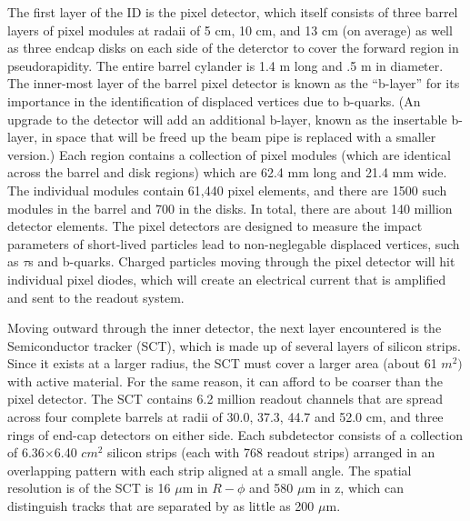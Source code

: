 The first layer of the ID is the pixel detector, which itself consists of three barrel layers of pixel modules at radaii of 5 cm, 10 cm, and 13 cm (on average) as well as three endcap disks on each side of the deterctor to cover the forward region in pseudorapidity.
The entire barrel cylander is 1.4 m long and .5 m in diameter.
The inner-most layer of the barrel pixel detector is known as the ``b-layer'' for its importance in the identification of displaced vertices due to b-quarks.
(An upgrade to the detector will add an additional b-layer, known as the insertable b-layer, in space that will be freed up the beam pipe is replaced with a smaller version.)
Each region contains a collection of pixel modules (which are identical across the barrel and disk regions) which are 62.4 mm long and 21.4 mm wide.
The individual modules contain 61,440 pixel elements, and there are 1500 such modules in the barrel and 700 in the disks. %
In total, there are about 140 million detector elements. %
The pixel detectors are designed to measure the impact parameters of short-lived particles lead to non-neglegable displaced vertices, such as $\tau$s and b-quarks.
Charged particles moving through the pixel detector will hit individual pixel diodes, which will create an electrical current that is amplified and sent to the readout system.


Moving outward through the inner detector, the next layer encountered is the Semiconductor tracker (SCT), which is made up of several layers of silicon strips.
Since it exists at a larger radius, the SCT must cover a larger area (about 61 $m^2)$ with active material.
For the same reason, it can afford to be coarser than the pixel detector.
The SCT contains 6.2 million readout channels that are spread across four complete barrels at radii of 30.0, 37.3, 44.7 and 52.0 cm, and three rings of end-cap detectors on either side.
Each subdetector consists of a collection of 6.36$\times$6.40 $cm^2$ silicon strips (each with 768 readout strips) arranged in an overlapping pattern with each strip aligned at a small angle.
The spatial resolution is of the SCT is 16 $\mu$m in $R-\phi$ and 580 $\mu$m in z, which can distinguish tracks that are separated by as little as 200 $\mu$m.


